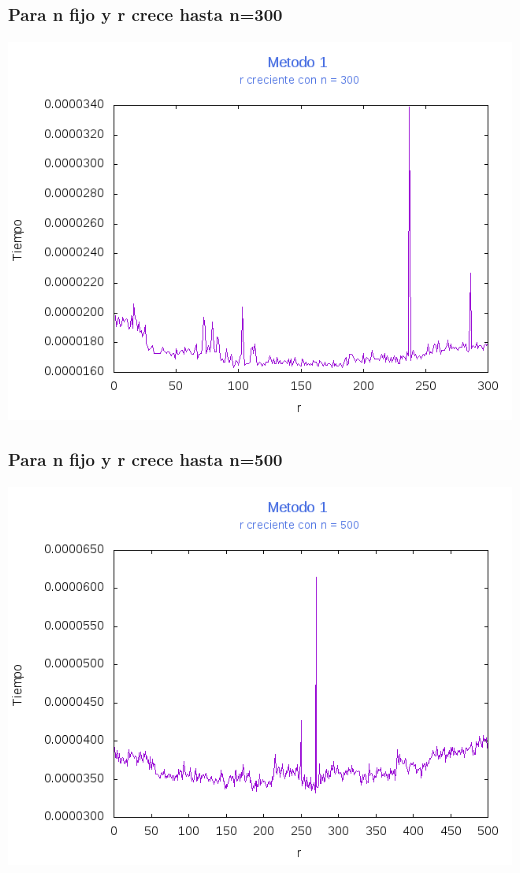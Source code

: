 \documentclass[12pt,letterpaper]{scrartcl}
\begin{document}
\subsubsection{Para n fijo y r crece hasta n=300}
\includegraphics[scale=1]{Metodo1/plot300m1}

\subsubsection{Para n fijo y r crece hasta n=500}
\includegraphics[scale=1]{Metodo1/plot500m1}
\end{document}
